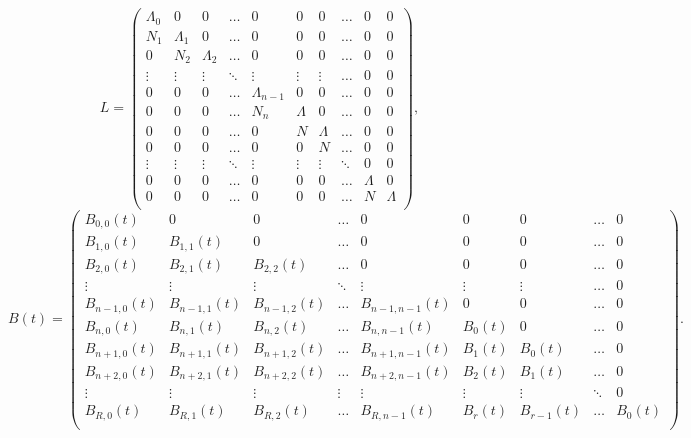 \noindent
$$
L=
\begin{pmatrix}
\Lambda_0 &   0       &  0        & \ldots & 0             & 0       &  0
    & \ldots & 0       & 0 \\
N_1       & \Lambda_1 &  0        & \ldots & 0             & 0       &  0
    & \ldots & 0       & 0 \\
0         & N_2       & \Lambda_2 & \ldots & 0             & 0       &  0
    & \ldots & 0       & 0 \\
\vdots    & \vdots    & \vdots    & \ddots & \vdots        & \vdots  &
\vdots
    & \ldots & 0       & 0 \\
0         &  0        &  0        & \ldots & \Lambda_{n-1} & 0       &  0
    & \ldots & 0       & 0 \\
0         &  0        &  0        & \ldots & N_n           & \Lambda &  0
    & \ldots & 0       & 0 \\
0         &  0        &  0        & \ldots & 0             & N       &
\Lambda
    & \ldots & 0       & 0 \\
0         &  0        &  0        & \ldots & 0             & 0       & N
    & \ldots & 0       & 0 \\
\vdots    & \vdots    & \vdots    & \ddots & \vdots        & \vdots  &
\vdots
    & \ddots & 0       & 0 \\
0         & 0         & 0         & \ldots & 0             & 0       & 0
    & \ldots & \Lambda & 0 \\
0         & 0         & 0         & \ldots & 0             & 0       & 0
    & \ldots & N       & \Lambda \\
  \end{pmatrix},
$$
$$
B(t)=
  \begin{pmatrix}
B_{0,0}(t)   &  0           &  0          & \ldots &  0            &  0
     &  0        & \ldots    & 0   \\
B_{1,0}(t)   & B_{1,1}(t)   &  0          & \ldots &  0            &  0
     &  0        & \ldots    & 0   \\
B_{2,0}(t)   & B_{2,1}(t)   &  B_{2,2}(t) & \ldots &  0            &  0
     &  0        & \ldots    & 0   \\
\vdots      & \vdots      & \vdots      & \ddots & \vdots        & \vdots
     & \vdots    & \ldots    & 0   \\
B_{n-1,0}(t)& B_{n-1,1}(t)& B_{n-1,2}(t)& \ldots & B_{n-1,n-1}(t)&  0
     &  0        & \ldots    & 0   \\
B_{n,0}(t)   & B_{n,1}(t)   & B_{n,2}(t)   & \ldots & B_{n,n-1}(t)  & B_0(t)
     & 0         & \ldots    & 0   \\
B_{n+1,0}(t)& B_{n+1,1}(t)& B_{n+1,2}(t)& \ldots & B_{n+1,n-1}(t)& B_1(t)
     & B_0(t)    & \ldots    & 0   \\
B_{n+2,0}(t)& B_{n+2,1}(t)& B_{n+2,2}(t)& \ldots & B_{n+2,n-1}(t)& B_2(t)
     & B_1(t)    & \ldots & 0   \\
\vdots      & \vdots      & \vdots      & \vdots & \vdots        & \vdots
     & \vdots    & \ddots & 0 \\
B_{R,0}(t)& B_{R,1}(t)& B_{R,2}(t)& \ldots & B_{R,n-1}(t)& B_r(t)
     & B_{r-1}(t)& \ldots & B_0(t)  \\
  \end{pmatrix}.
$$
